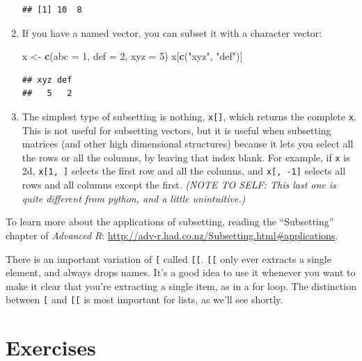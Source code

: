 \documentclass[
]{book}
\newenvironment{Shaded}{\begin{snugshade}}{\end{snugshade}}
\newcommand{\DataTypeTok}[1]{\textcolor[rgb]{0.13,0.29,0.53}{#1}}
\newcommand{\DecValTok}[1]{\textcolor[rgb]{0.00,0.00,0.81}{#1}}
\newcommand{\KeywordTok}[1]{\textcolor[rgb]{0.13,0.29,0.53}{\textbf{#1}}}
\newcommand{\NormalTok}[1]{#1}
\newcommand{\StringTok}[1]{\textcolor[rgb]{0.31,0.60,0.02}{#1}}
\begin{document}
\begin{enumerate}
\begin{verbatim}
## [1] 10  8
\end{verbatim}
\item
  If you have a named vector, you can subset it with a character vector:

\begin{Shaded}
\begin{Highlighting}[]
\NormalTok{x <-}\StringTok{ }\KeywordTok{c}\NormalTok{(}\DataTypeTok{abc =} \DecValTok{1}\NormalTok{, }\DataTypeTok{def =} \DecValTok{2}\NormalTok{, }\DataTypeTok{xyz =} \DecValTok{5}\NormalTok{)}
\NormalTok{x[}\KeywordTok{c}\NormalTok{(}\StringTok{"xyz"}\NormalTok{, }\StringTok{"def"}\NormalTok{)]}
\end{Highlighting}
\end{Shaded}

\begin{verbatim}
## xyz def 
##   5   2
\end{verbatim}
\item
  The simplest type of subsetting is nothing, \texttt{x{[}{]}}, which returns the complete \texttt{x}.
  This is not useful for subsetting vectors, but it is useful when subsetting matrices (and other high dimensional structures) because it lets you select all the rows or all the columns, by leaving that index blank.
  For example, if \texttt{x} is 2d, \texttt{x{[}1,\ {]}} selects the first row and all the columns, and \texttt{x{[},\ -1{]}} selects all rows and all columns except the first. \emph{(NOTE TO SELF: This last one is quite different from python, and a little unintuitive.)}
\end{enumerate}

To learn more about the applications of subsetting, reading the ``Subsetting'' chapter of \emph{Advanced R}: \url{http://adv-r.had.co.nz/Subsetting.html\#applications}.

There is an important variation of \texttt{{[}} called \texttt{{[}{[}}.
\texttt{{[}{[}} only ever extracts a single element, and always drops names.
It's a good idea to use it whenever you want to make it clear that you're extracting a single item, as in a for loop.
The distinction between \texttt{{[}} and \texttt{{[}{[}} is most important for lists, as we'll see shortly.

\hypertarget{exercises}{%
\section{Exercises}\label{exercises}}
\end{document}
